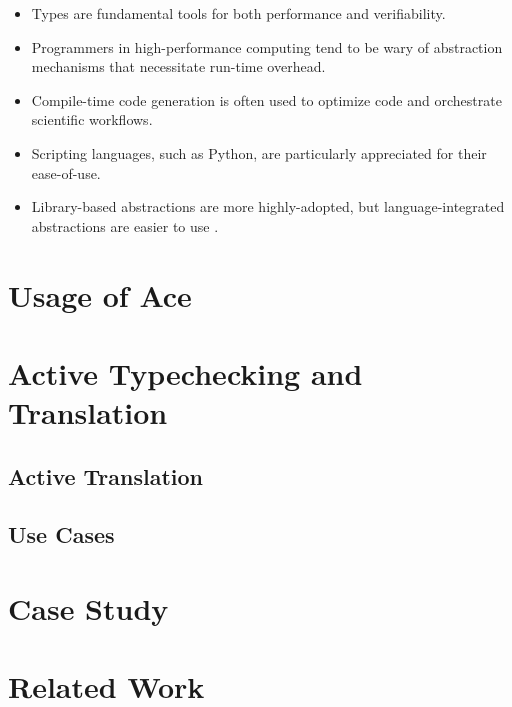 \documentclass{sig-alternate}
\begin{document}
\begin{itemize}
\item Types are fundamental tools for both performance and verifiability.
\item Programmers in high-performance computing tend to be wary of abstraction mechanisms that necessitate run-time overhead.
\item Compile-time code generation is often used to optimize code and orchestrate scientific workflows.
\item Scripting languages, such as Python, are particularly appreciated for their ease-of-use.
\item Library-based abstractions are more highly-adopted, but language-integrated abstractions are easier to use \cite{xxx}.
\end{itemize}


\section{Usage of Ace}\label{usage}

\section{Active Typechecking and Translation}\label{att}
\subsection{Active Translation}\label{translation}
\subsection{Use Cases}\label{usecases}
\section{Case Study}\label{casestudy}
\section{Related Work}\label{related}
\end{document}
